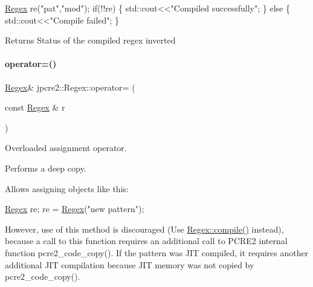 \begin{DoxyCode}
\hyperlink{classjpcre2_1_1Regex_a302f65cd5747c5d34570ca76516ab715_a302f65cd5747c5d34570ca76516ab715}{Regex} re(\textcolor{stringliteral}{"pat"},\textcolor{stringliteral}{"mod"});
\textcolor{keywordflow}{if}(!!re) \{
    std::cout<<\textcolor{stringliteral}{"Compiled successfully"};
\} \textcolor{keywordflow}{else} \{
    std::cout<<\textcolor{stringliteral}{"Compile failed"};
\}
\end{DoxyCode}
 \begin{DoxyReturn}{Returns}
Status of the compiled regex inverted 
\end{DoxyReturn}
\hypertarget{classjpcre2_1_1Regex_ab43a14b4b6e75b7fa3221bc18a1d4121_ab43a14b4b6e75b7fa3221bc18a1d4121}{}\label{classjpcre2_1_1Regex_ab43a14b4b6e75b7fa3221bc18a1d4121_ab43a14b4b6e75b7fa3221bc18a1d4121} 
\paragraph{\texorpdfstring{operator=()}{operator=()}}
{\footnotesize\ttfamily \hyperlink{classjpcre2_1_1Regex}{Regex}\& jpcre2\+::\+Regex\+::operator= (\begin{DoxyParamCaption}\item[{const \hyperlink{classjpcre2_1_1Regex}{Regex} \&}]{r }\end{DoxyParamCaption})\hspace{0.3cm}{\ttfamily [inline]}}



Overloaded assignment operator. 

Performs a deep copy.

Allows assigning objects like this\+: 
\begin{DoxyCode}
\hyperlink{classjpcre2_1_1Regex_a302f65cd5747c5d34570ca76516ab715_a302f65cd5747c5d34570ca76516ab715}{Regex} re;
re = \hyperlink{classjpcre2_1_1Regex_a302f65cd5747c5d34570ca76516ab715_a302f65cd5747c5d34570ca76516ab715}{Regex}(\textcolor{stringliteral}{"new pattern"});
\end{DoxyCode}
 However, use of this method is discouraged (Use \hyperlink{classjpcre2_1_1Regex_aad1d5ef1e87f762f68a587eec4022e69_aad1d5ef1e87f762f68a587eec4022e69}{Regex\+::compile()} instead), because a call to this function requires an additional call to P\+C\+R\+E2 internal function pcre2\+\_\+code\+\_\+copy(). If the pattern was J\+IT compiled, it requires another additional J\+IT compilation because J\+IT memory was not copied by pcre2\+\_\+code\+\_\+copy().

